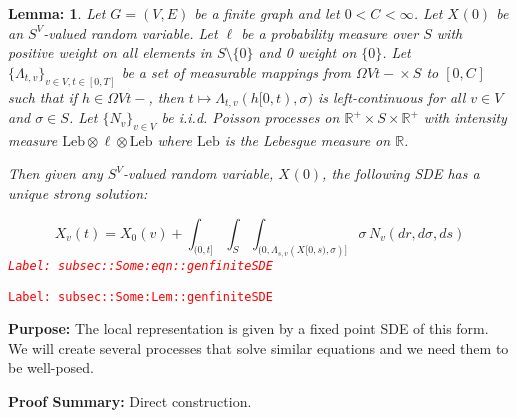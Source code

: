 \documentclass[12pt]{article}
\newcommand{\mb}{\mathbb}
\newcommand{\te}{\text}
\newcommand{\tr}{\textcolor{red}}
\newcommand{\labe}[1]{\tr{\texttt{Label: #1}}}
\newcommand{\purpose}{\textbf{Purpose: }}
\newcommand{\pfsum}{\textbf{Proof Summary: }}
\newcommand{\ind}{\hspace{24pt}}
\renewcommand{\v}{v}							%
\renewcommand{\S}{S}							%
\newcommand{\s}{\sigma}							%
\newcommand{\T}{T}								%
\renewcommand{\t}{t}							%
\renewcommand{\tt}{s}							%
\newcommand{\poiss}[1]{N_{#1}}						%
\newcommand{\leb}{\te{Leb}}							%
\renewcommand{\G}{G}								%
\newcommand{\V}{V}									%
\newcommand{\E}{E}									%
\renewcommand{\r}{r}								%
\newcommand{\rxvt}[2]{X_{#1}{(#2)}}					%
\newcommand{\rxvts}[2]{X_{#1}{#2}}					%
\newcommand{\ratee}[1]{\Lambda_{#1}}				%
\newcommand{\const}[1]{C_{#1}}						%
\newcommand{\Sm}{\ell}								%
\newtheorem{lem}[thms]{Lemma: }
\begin{document}
\begin{lem}
Let \(\G = (\V,\E)\) be a finite graph and let \(0 < \const{}< \infty\). Let \(\rxvt{}{0}\) be an \(\S^\V\)-valued random variable. Let \(\Sm\) be a probability measure over \(\S\) with positive weight on all elements in \(S\setminus\{0\}\) and 0 weight on \(\{0\}\). Let \(\{\ratee{\t,\v}\}_{\v \in \V,\t\in [0,\T]}\) be a set of measurable mappings from \(\Omega{\V}{\t-} \times \S\) to \([0,\const{}]\) such that if \(h \in \Omega{\V}{\t-}\), then \(\t\mapsto \ratee{\t,\v}(h[0,\t),\s)\) is left-continuous for all \(\v \in \V\) and \(\s \in \S\). Let \(\{\poiss{\v}\}_{\v \in \V}\) be i.i.d. Poisson processes on \(\mb{R}^+\times \S\times\mb{R}^+\) with intensity measure \(\leb\otimes\Sm\otimes\leb\) where \(\leb\) is the Lebesgue measure on \(\mb{R}\).

\ind Then given any \(\S^\V\)-valued random variable, \(\rxvt{}{0}\), the following SDE has a unique strong solution:

\begin{equation}
\rxvt{\v}{\t} = \rxvt{0}{\v} + \int_{(0,\t]}\int_\S\int_{(0,\ratee{\tt,\v}(\rxvts{}{[0,\tt)},\s)]}  \s\,\poiss{\v}(d\r,d\s,d\tt)
\label{subsec::Some:eqn::genfiniteSDE}
\end{equation}
\labe{subsec::Some:eqn::genfiniteSDE}
\label{subsec::Some:Lem::genfiniteSDE}
\end{lem}
\labe{subsec::Some:Lem::genfiniteSDE}

\purpose The local representation is given by a fixed point SDE of this form. We will create several processes that solve similar equations and we need them to be well-posed.

\pfsum Direct construction.
\end{document}
